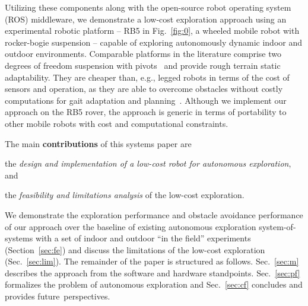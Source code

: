\documentclass[letterpaper,10pt,conference,twoside]{IEEEtran}
\theoremstyle{definition}
\begin{document}
Utilizing these components along with the open-source robot operating system (ROS) middleware, we %
demonstrate a low-cost %
exploration approach %
using an experimental robotic platform -- RB5 in Fig.~\ref{fig:0}, a wheeled mobile robot with rocker-bogie suspension -- capable of exploring autonomously dynamic indoor and outdoor environments.
Comparable platforms in the literature comprise two degrees of freedom suspension with pivots~\cite{setterfield2013terrain,%
faisal2021low} and provide rough terrain static adaptability. %
They are cheaper than, e.g., legged robots in terms of the cost of sensors %
and operation, as they are able to overcome obstacles without costly computations for gait adaptation and planning~\cite{muller2021openbot}.
Although %
we implement our approach on the RB5 rover, %
the approach is generic in terms of portability to other mobile robots with cost and computational constraints.

The main \textbf{contributions} of this systems paper are 
\begin{enumerate*}[label={(\alph*)},font={\textit}]
  \item the \textit{design and implementation of a low-cost robot for autonomous exploration}, and 
  \item the \textit{feasibility and limitations analysis} of the low-cost exploration. 
\end{enumerate*}
We demonstrate the exploration performance and obstacle avoidance performance of our approach over the baseline of existing autonomous exploration system-of-systems with a set of indoor and outdoor “in the field” experiments (Section~\ref{sec:fe}) and discuss the limitations of the low-cost exploration (Sec.~\ref{sec:lim}). The remainder of the paper is structured as follows. Sec.~\ref{sec:m} describes the approach from the software and hardware standpoints. Sec.~\ref{sec:pf} formalizes the problem of autonomous exploration and Sec.~\ref{sec:cf} concludes and provides future~perspectives.


\end{document}
